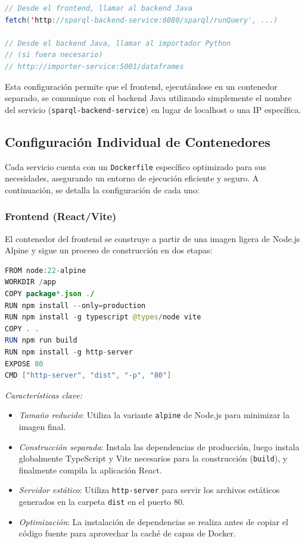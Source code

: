 \documentclass{article}
\begin{document}
\begin{lstlisting}[language=java, basicstyle=\small\ttfamily]
// Desde el frontend, llamar al backend Java
fetch('http://sparql-backend-service:8080/sparql/runQuery', ...)

// Desde el backend Java, llamar al importador Python
// (si fuera necesario)
// http://importer-service:5001/dataframes
\end{lstlisting}

Esta configuración permite que el frontend, ejecutándose en un contenedor separado, se comunique con el backend Java utilizando simplemente el nombre del servicio (\texttt{sparql-backend-service}) en lugar de localhost o una IP específica.

\subsection{Configuración Individual de Contenedores}

Cada servicio cuenta con un \texttt{Dockerfile} específico optimizado para sus necesidades, asegurando un entorno de ejecución eficiente y seguro. A continuación, se detalla la configuración de cada uno:

\subsubsection{Frontend (React/Vite)}
El contenedor del frontend se construye a partir de una imagen ligera de Node.js Alpine y sigue un proceso de construcción en dos etapas:
\begin{lstlisting}[language=java, basicstyle=\small\ttfamily]
FROM node:22-alpine
WORKDIR /app
COPY package*.json ./
RUN npm install --only=production
RUN npm install -g typescript @types/node vite
COPY . .
RUN npm run build
RUN npm install -g http-server
EXPOSE 80
CMD ["http-server", "dist", "-p", "80"]
\end{lstlisting}
\textit{Características clave:}
\begin{itemize}
\item \textit{Tamaño reducido}: Utiliza la variante \texttt{alpine} de Node.js para minimizar la imagen final.
\item \textit{Construcción separada}: Instala las dependencias de producción, luego instala globalmente TypeScript y Vite necesarios para la construcción (\texttt{build}), y finalmente compila la aplicación React.
\item \textit{Servidor estático}: Utiliza \texttt{http-server} para servir los archivos estáticos generados en la carpeta \texttt{dist} en el puerto 80.
\item \textit{Optimización}: La instalación de dependencias se realiza antes de copiar el código fuente para aprovechar la caché de capas de Docker.
\end{itemize}
\end{document}
